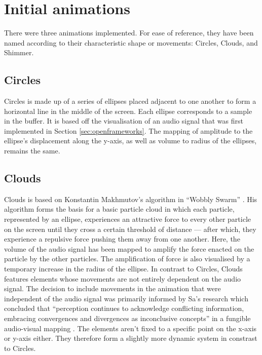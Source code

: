 \documentclass[../initial_thesis.tex]{subfiles}
\begin{document}
\section{Initial animations}
There were three animations implemented. For ease of reference, they have been named according to their characteristic shape or movements: Circles, Clouds, and Shimmer.

\subsection{Circles}
Circles is made up of a series of ellipses placed adjacent to one another to form a horizontal line in the middle of the screen. Each ellipse corresponds to a sample in the buffer. It is based off the visualisation of an audio signal that was first implemented in Section \ref{sec:openframeworks}. The mapping of amplitude to the ellipse's displacement along the y-axis, as well as volume to radius of the ellipses, remains the same.

\subsection{Clouds}
Clouds is based on Konstantin Makhmutov's algorithm in ``Wobbly Swarm'' \cite{Makhmutov}. His algorithm forms the basis for a basic particle cloud in which each particle, represented by an ellipse, experiences an attractive force to every other particle on the screen until they cross a certain threshold of distance --- after which, they experience a repulsive force pushing them away from one another. Here, the volume of the audio signal has been mapped to amplify the force enacted on the particle by the other particles. The amplification of force is also visualised by a temporary increase in the radius of the ellipse. In contrast to Circles, Clouds features elements whose movements are not entirely dependent on the audio signal. The decision to include movements in the animation that were independent of the audio signal was primarily informed by Sa's research which concluded that ``perception continues to acknowledge conflicting information, embracing convergences and divergences as inconclusive concepts'' in a fungible audio-visual mapping \cite{Sa2014}.  The elements aren't fixed to a specific point on the x-axis or y-axis either. They therefore form a slightly more dynamic system in constrast to Circles.
\end{document}

